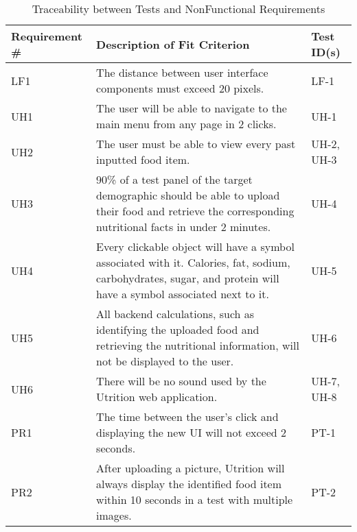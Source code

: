 \documentclass[12pt, titlepage]{article}
\begin{document}
	\begin{table}[H]
		\caption{Traceability between Tests and NonFunctional Requirements}
		\begin{tabularx}{\linewidth}{|l|X|l|}
			\hline
			{\bf Requirement \#} & {\bf Description of Fit Criterion} & {\bf Test ID(s)}\\
			\hline
			LF1 & The distance between user interface components must exceed 20 pixels. & LF-1 \\
			\hline
			UH1 & The user will be able to navigate to the main menu from any page in 2 clicks. & UH-1 \\
			\hline
			UH2 & The user must be able to view every past inputted food item. & UH-2, UH-3 \\
			\hline
			UH3 & 90\% of a test panel of the target demographic should be able to upload their food and retrieve the corresponding nutritional facts in under 2 minutes. & UH-4 \\
			\hline
			UH4 & Every clickable object will have a symbol associated with it. Calories, fat, sodium, carbohydrates, sugar, and protein will have a symbol associated next to it.
			& UH-5 \\
			\hline
			UH5 & All backend calculations, such as identifying the uploaded food and retrieving the nutritional information, will not be displayed to the user. & UH-6 \\
			\hline
			UH6 & There will be no sound used by the Utrition web application.  & UH-7, UH-8 \\
			\hline
			PR1 & The time between the user’s click and displaying the new UI will not exceed 2 seconds. & PT-1 \\
			\hline
			PR2 & After uploading a picture, Utrition will always display the 
			identified food item within 10 seconds in a test with multiple 
			images. & PT-2 \\
			\hline
		\end{tabularx}
		\label{tab:NonFunctional Traceability}
	\end{table}
\end{document}
